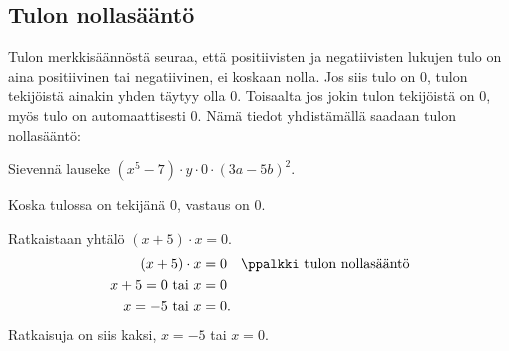 \newpage

\subsection*{Tulon nollasääntö}

Tulon merkkisäännöstä seuraa, että positiivisten ja negatiivisten lukujen tulo on aina positiivinen tai negatiivinen, ei koskaan nolla.
Jos siis tulo on $0$, tulon tekijöistä ainakin yhden täytyy olla $0$.
Toisaalta jos jokin tulon tekijöistä on $0$, myös tulo on automaattisesti $0$.
Nämä tiedot yhdistämällä saadaan tulon nollasääntö:



\begin{esimerkki}
Sievennä lauseke $(x^5-7)\cdot y \cdot 0\cdot(3a-5b)^2$.
    \begin{esimratk}
	Koska tulossa on tekijänä $0$, vastaus on $0$.
    \end{esimratk}
\end{esimerkki}

\begin{esimerkki} Ratkaistaan yhtälö $(x+5) \cdot x =0 $.
    \begin{align*}
        (x+5)\cdot x &=0 \quad \ppalkki \text{ tulon nollasääntö} \\
        x +5= 0 \text{ tai } x &=0 \\
        x= -5 \text{ tai } x &=0.
    \end{align*}
    Ratkaisuja on siis kaksi, $x= -5$ tai $x= 0$.
\end{esimerkki}



